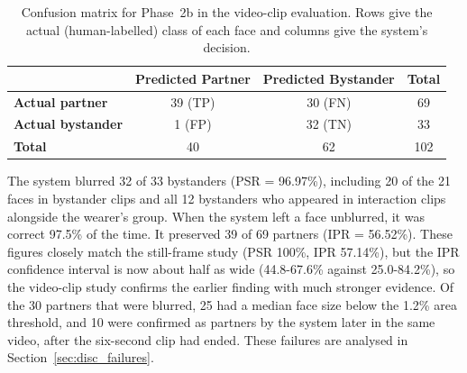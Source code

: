 \begin{table}[htbp]
\begin{singlespace}
\centering
\caption{Confusion matrix for Phase~2b in the video-clip evaluation. Rows give the
actual (human-labelled) class of each face and columns give the system's decision.}
\label{tab:confusion_clips}
\renewcommand{\arraystretch}{1.3}
\begin{tabular}{@{}lccc@{}}
\toprule
 & \textbf{Predicted Partner} & \textbf{Predicted Bystander} & \textbf{Total} \\
\midrule
\textbf{Actual partner}   & 39 (TP) & 30 (FN) & 69 \\
\textbf{Actual bystander} & 1 (FP)  & 32 (TN) & 33 \\
\textbf{Total}            & 40      & 62      & 102 \\
\bottomrule
\end{tabular}
\end{singlespace}
\end{table}

\begin{table}[htbp]
\begin{singlespace}
\centering
\caption{Phase~2b metrics in the video-clip evaluation, with 95\% Wilson confidence
intervals. IPR is not defined for bystander clips, which contain no partners.}
\label{tab:metrics_clips}
\renewcommand{\arraystretch}{1.3}
\end{singlespace}
\end{table}

The system blurred 32 of 33 bystanders (PSR = 96.97\%), including 20 of the 21 faces
in bystander clips and all 12 bystanders who appeared in interaction clips alongside
the wearer's group. When the system left a face unblurred, it was correct 97.5\% of
the time. It preserved 39 of 69 partners (IPR = 56.52\%). These figures closely match
the still-frame study (PSR 100\%, IPR 57.14\%), but the IPR confidence interval is now
about half as wide (44.8-67.6\% against 25.0-84.2\%), so the video-clip study confirms
the earlier finding with much stronger evidence. Of the 30 partners that were
blurred, 25 had a median face size below the 1.2\% area threshold, and 10 were
confirmed as partners by the system later in the same video, after the six-second
clip had ended. These
failures are analysed in Section~\ref{sec:disc_failures}.

